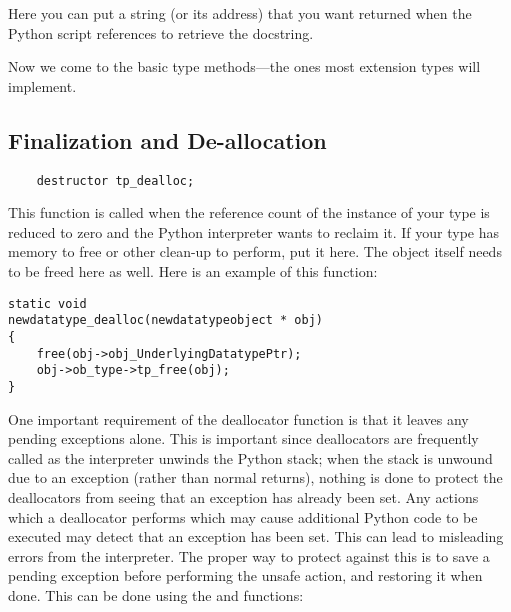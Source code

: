 Here you can put a string (or its address) that you want returned when
the Python script references  to retrieve the
docstring.
   
Now we come to the basic type methods---the ones most extension types
will implement.


\subsection{Finalization and De-allocation}


\begin{verbatim}
    destructor tp_dealloc;
\end{verbatim}

This function is called when the reference count of the instance of
your type is reduced to zero and the Python interpreter wants to
reclaim it.  If your type has memory to free or other clean-up to
perform, put it here.  The object itself needs to be freed here as
well.  Here is an example of this function:

\begin{verbatim}
static void
newdatatype_dealloc(newdatatypeobject * obj)
{
    free(obj->obj_UnderlyingDatatypePtr);
    obj->ob_type->tp_free(obj);
}
\end{verbatim}

One important requirement of the deallocator function is that it
leaves any pending exceptions alone.  This is important since
deallocators are frequently called as the interpreter unwinds the
Python stack; when the stack is unwound due to an exception (rather
than normal returns), nothing is done to protect the deallocators from
seeing that an exception has already been set.  Any actions which a
deallocator performs which may cause additional Python code to be
executed may detect that an exception has been set.  This can lead to
misleading errors from the interpreter.  The proper way to protect
against this is to save a pending exception before performing the
unsafe action, and restoring it when done.  This can be done using the
 and
 functions:

